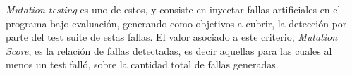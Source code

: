 


\emph{Mutation testing} es uno de estos, y consiste en inyectar fallas artificiales en el programa bajo evaluaci\'on, generando como objetivos a cubrir, la detecci\'on por parte del test suite de estas fallas. El valor asociado a este criterio, \emph{Mutation Score}, es la relaci\'on de fallas detectadas, es decir aquellas para las cuales al menos un test fall\'o, sobre la cantidad total de fallas generadas.


